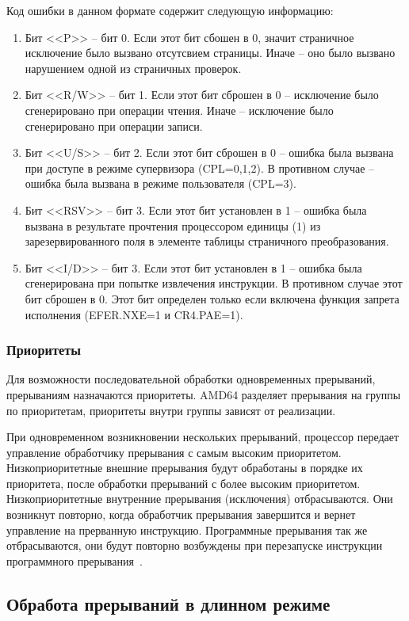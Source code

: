 Код ошибки в данном формате содержит следующую информацию:
\begin{enumerate}[1.]
\item Бит <<P>> -- бит 0. Если этот бит сбошен в 0, значит страничное исключение было
вызвано отсутсвием страницы. Иначе -- оно было вызвано нарушением одной из
страничных проверок.
\item Бит <<R/W>> -- бит 1. Если этот бит сброшен в 0 -- исключение было сгенерировано
при операции чтения. Иначе -- исключение было сгенерировано при операции записи.
\item Бит <<U/S>> -- бит 2. Если этот бит сброшен в 0 -- ошибка была вызвана при
доступе в режиме супервизора (CPL=0,1,2). В противном случае -- ошибка была
вызвана в режиме пользователя (CPL=3).
\item Бит <<RSV>> -- бит 3. Если этот бит установлен в 1 -- ошибка была вызвана в
результате прочтения процессором единицы (1) из зарезервированного поля в
элементе таблицы страничного преобразования.
\item Бит <<I/D>> -- бит 3. Если этот бит установлен в 1 -- ошибка была сгенерирована
при попытке извлечения инструкции. В противном случае этот бит
сброшен в 0. Этот бит определен только если включена функция запрета
исполнения (EFER.NXE=1 и CR4.PAE=1).
\end{enumerate}

\subsubsection*{Приоритеты}
Для возможности последовательной обработки одновременных прерываний,
прерываниям назначаются приоритеты. AMD64 разделяет прерывания на группы по
приоритетам, приоритеты внутри группы зависят от реализации.

При одновременном возникновении нескольких прерываний, процессор передает
управление обработчику прерывания с самым высоким приоритетом.
Низкоприоритетные внешние прерывания будут обработаны в порядке их приоритета,
после обработки прерываний с более высоким приоритетом. Низкоприоритетные
внутренние прерывания (исключения) отбрасываются. Они возникнут повторно,
когда обработчик прерывания завершится и вернет управление на прерванную
инструкцию. Программные прерывания так же отбрасываются, они будут повторно
возбуждены при перезапуске инструкции программного прерывания~\cite[стр. 232]{amd_pm_v2}.

\subsection{Обработа прерываний в длинном режиме}
